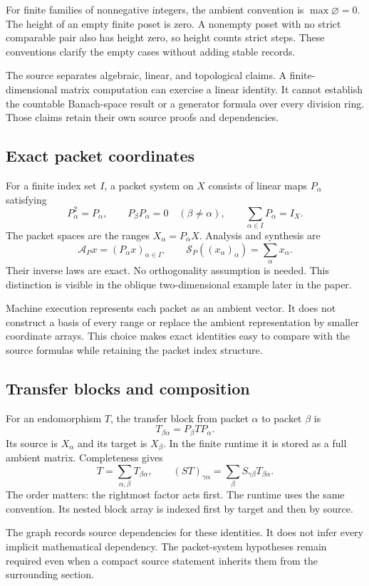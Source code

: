 \documentclass[a4paper,11pt]{article}
\begin{document}
For finite families of nonnegative integers, the ambient convention is $\max\varnothing=0$. The height of an empty finite poset is zero. A nonempty poset with no strict comparable pair also has height zero, so height counts strict steps. These conventions clarify the empty cases without adding stable records.

The source separates algebraic, linear, and topological claims. A finite-dimensional matrix computation can exercise a linear identity. It cannot establish the countable Banach-space result or a generator formula over every division ring. Those claims retain their own source proofs and dependencies.
\subsection{Exact packet coordinates}
For a finite index set $I$, a packet system on $X$ consists of linear maps $P_\alpha$ satisfying
\[
P_\alpha^2=P_\alpha,\qquad
P_\beta P_\alpha=0\quad(\beta\ne\alpha),\qquad
\sum_{\alpha\in I}P_\alpha=I_X.
\]
The packet spaces are the ranges $X_\alpha=P_\alpha X$. Analysis and synthesis are
\[
\mathcal A_Px=(P_\alpha x)_{\alpha\in I},\qquad
\mathcal S_P((x_\alpha)_\alpha)=\sum_\alpha x_\alpha.
\]
Their inverse laws are exact. No orthogonality assumption is needed. This distinction is visible in the oblique two-dimensional example later in the paper.

Machine execution represents each packet as an ambient vector. It does not construct a basis of every range or replace the ambient representation by smaller coordinate arrays. This choice makes exact identities easy to compare with the source formulas while retaining the packet index structure.
\subsection{Transfer blocks and composition}
For an endomorphism $T$, the transfer block from packet $\alpha$ to packet $\beta$ is
\[
T_{\beta\alpha}=P_\beta TP_\alpha.
\]
Its source is $X_\alpha$ and its target is $X_\beta$. In the finite runtime it is stored as a full ambient matrix. Completeness gives
\[
T=\sum_{\alpha,\beta}T_{\beta\alpha},\qquad
(ST)_{\gamma\alpha}=\sum_\beta S_{\gamma\beta}T_{\beta\alpha}.
\]
The order matters: the rightmost factor acts first. The runtime uses the same convention. Its nested block array is indexed first by target and then by source.

The graph records source dependencies for these identities. It does not infer every implicit mathematical dependency. The packet-system hypotheses remain required even when a compact source statement inherits them from the surrounding section.
\end{document}
